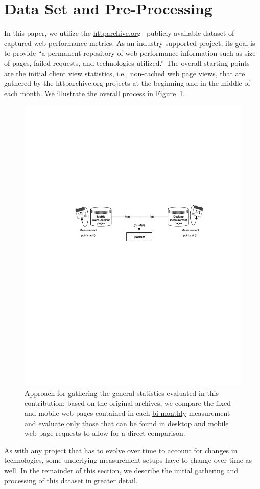 \documentclass[onecolumn,12pt]{IEEEtran}
\begin{document}
\section{Data Set and Pre-Processing}
\label{s:dataset}
In this paper, we utilize the \url{httparchive.org}~\cite{ht13} publicly available dataset of captured web performance metrics. 
As an industry-supported project, its goal is to provide ``a permanent repository of web performance information such as size of pages, failed requests, and technologies utilized.''
The overall starting points are the initial client view statistics, i.e., non-cached web page views, that are gathered by the httparchive.org projects at the beginning and in the middle of each month.
We illustrate the overall process in Figure~\ref{fig:setup}.
\begin{figure}
	\centering
	\includegraphics[width=.45\linewidth]{setup}
	\caption{Approach for gathering the general statistics evaluated in this contribution: based on the original archives, we compare the fixed and mobile web pages contained in each \uline{bi-monthly} measurement and evaluate only those that can be found in desktop and mobile web page requests to allow for a direct comparison.}
	\label{fig:setup}
\end{figure}
As with any project that has to evolve over time to account for changes in technologies, some underlying measurement setups have to change over time as well.
In the remainder of this section, we describe the initial gathering and processing of this dataset in greater detail.
\end{document}

